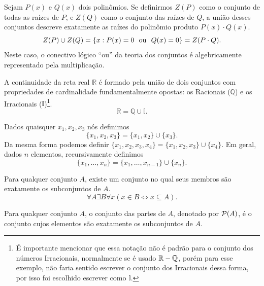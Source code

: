 

\begin{exemplo}
    Sejam \(P(x)\) e \(Q(x)\) dois polinômios. Se definirmos \(Z(P)\) como o conjunto de todas as raízes de \(P\), e \(Z(Q)\) como o conjunto das raízes de \(Q\), a união desses conjuntos descreve exatamente as raízes do polinômio produto \(P(x) \cdot Q(x)\).
    \[
        Z(P) \cup Z(Q) = \{x : P(x) = 0 \ \text{ ou }\  Q(x) = 0\} = Z(P \cdot Q).
    \]
    Neste caso, o conectivo lógico ``ou''  da teoria dos conjuntos é algebricamente representado pela multiplicação.
\end{exemplo}

\begin{exemplo}
    A continuidade da reta real \(\mathbb{R}\) é formado pela união de dois conjuntos com propriedades de cardinalidade fundamentalmente opostas: os Racionais (\(\mathbb{Q}\)) e os Irracionais (\(\mathbb{I}\))\footnote{É importante mencionar que essa notação não é padrão para o conjunto dos números Irracionais, normalmente se é usado \(\mathbb{R} - \mathbb{Q}\), porém para esse exemplo, não faria sentido escrever o conjunto dos Irracionais dessa forma, por isso foi escolhido escrever como \(\mathbb{I}\).}.
    \[
        \mathbb{R} = \mathbb{Q} \cup \mathbb{I}.
    \]
\end{exemplo}

\begin{definicao}
    \label{def:conjunto_das_partes}
    \label{def:conjuntos_finitos}
    Dados quaisquer \(x_1, x_2, x_3\) nós definimos
    \[
        \{x_1, x_2, x_3\} = \{x_1, x_2\} \cup \{x_3\}.
    \]
    Da mesma forma podemos definir \(\{x_1, x_2, x_3, x_4\} = \{x_1, x_2, x_3\} \cup  \{x_4\}\). Em geral, dados \(n\) elementos, recursivamente definimos
    \[
        \{x_1, \dots, x_n\} = \{x_1, \dots, x_{n-1}\} \cup \{x_n\}.
    \]
\end{definicao}

\begin{axioma}
    \label{ax:potencia}
    Para qualquer conjunto \(A\), existe um conjunto no qual seus membros são exatamente os subconjuntos de \(A\).
    \[
        \forall A \exists B \forall x (x \in B \iff x \subseteq A).
    \]
\end{axioma}

\begin{definicao}
    Para qualquer conjunto \(A\), o conjunto das partes de \(A\), denotado por \(\mathcal{P} (A)\), é o conjunto cujos elementos são exatamente os subconjuntos de \(A\).
\end{definicao}

